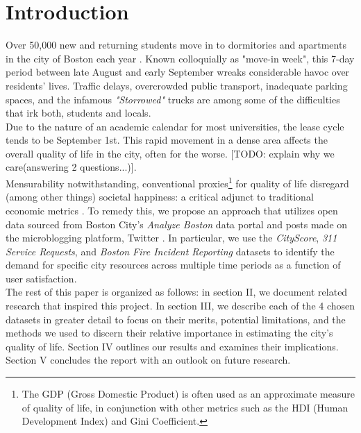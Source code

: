 \documentclass[journal, a4paper]{IEEEtran}
\begin{document}
\section{Introduction}
    \IEEEPARstart{}Over 50,000 new and returning students move in to dormitories and apartments in the city of Boston each year \cite{moveinstats}. Known colloquially as "move-in week", this 7-day period between late August and early September wreaks considerable havoc over residents' lives. Traffic delays, overcrowded public transport, inadequate parking spaces, and the infamous \textit{"Storrowed"} trucks \cite{storrowed} are among some of the difficulties that irk both, students and locals.
\\Due to the nature of an academic calendar for most universities, the lease cycle tends to be September 1st. This rapid movement in a dense area affects the overall quality of life in the city, often for the worse. [TODO: explain why we care(answering 2 questions...)].
\\Mensurability notwithstanding, conventional proxies\footnote{The GDP (Gross Domestic Product) is often used as an approximate measure of quality of life, in conjunction with other metrics such as the HDI (Human Development Index) and Gini Coefficient.} for quality of life disregard (among other things) societal happiness: a critical adjunct to traditional economic metrics \cite{happytext}. 
To remedy this, we propose an approach that utilizes open data sourced from Boston City's \textit{Analyze Boston} data portal \cite{bosdatalink} and posts made on the microblogging platform, Twitter \cite{twitterlink}. In particular, we use the \textit{CityScore}, \textit{311 Service Requests}, and \textit{Boston Fire Incident Reporting} datasets to identify the demand for specific city resources across multiple time periods as a function of user satisfaction.
\\The rest of this paper is organized as follows: in section II, we document related research that inspired this project. In section III, we describe each of the 4 chosen datasets in greater detail to focus on their merits, potential limitations, and the methods we used to discern their relative importance in estimating the city's quality of life. Section IV outlines our results and examines their implications. Section V concludes the report with an outlook on future research.
\end{document}
